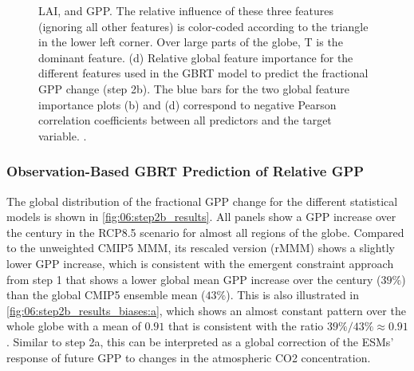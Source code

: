 \begin{figure}[p]
{    \acf{LAI}, and \acs{GPP}. The relative influence of these three features
    (ignoring all other features) is color-coded according to the triangle in
    the lower left corner. Over large parts of the globe, \acs{T} is the
    dominant feature. (d) Relative global feature importance for the different
    features used in the \acs{GBRT} model to predict the fractional \acs{GPP}
    change (step 2b). The blue bars for the two global feature importance plots
    (b) and (d) correspond to negative Pearson correlation coefficients between
    all predictors and the target variable. .
  }
  \label{fig:06:step2b_ml_inference}
\end{figure}


\subsubsection{Observation-Based \acs{GBRT} Prediction of Relative \acs{GPP}}
\label{subsubsec:06:results_step2b_obs}

The global distribution of the fractional \ac{GPP} change for the different
statistical models is shown in \cref{fig:06:step2b_results}. All panels show a
\ac{GPP} increase over the  century in the \acs{RCP}8.5 scenario for
almost all regions of the globe. Compared to the unweighted \acs{CMIP}5
\ac{MMM}, its rescaled version (r\acs{MMM}) shows a slightly lower \ac{GPP}
increase, which is consistent with the emergent constraint approach from step 1
that shows a lower global mean \ac{GPP} increase over the  century ($39
\unit{\%}$) than the global \acs{CMIP}5 ensemble mean ($43 \unit{\%}$). This is
also illustrated in \cref{fig:06:step2b_results_biases:a}, which shows an
almost constant pattern over the whole globe with a mean of $0.91$ that is
consistent with the ratio $39 \unit{\%} / 43 \unit{\%} \approx 0.91$. Similar
to step 2a, this can be interpreted as a global correction of the \acp{ESM}'
response of future \ac{GPP} to changes in the atmospheric \ac{CO2}
concentration.

